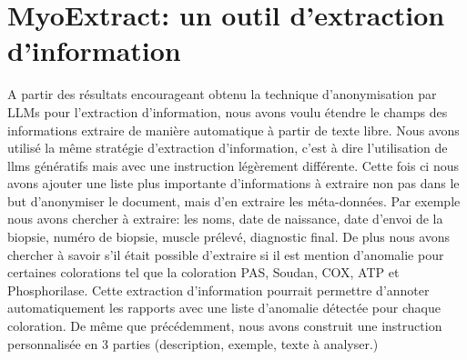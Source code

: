 \section{MyoExtract: un outil d'extraction d'information}
A partir des résultats encourageant obtenu la technique d'anonymisation par LLMs pour l'extraction d'information, nous avons voulu étendre le champs des informations extraire de manière automatique à partir de texte libre. Nous avons utilisé la même stratégie d'extraction d'information, c'est à dire l'utilisation de \gls{llms} génératifs mais avec une instruction légèrement différente. Cette fois ci nous avons ajouter une liste plus importante d'informations à extraire non pas dans le but d'anonymiser le document, mais d'en extraire les méta-données. Par exemple nous avons chercher à extraire: les noms, date de naissance, date d'envoi de la biopsie, numéro de biopsie, muscle prélevé, diagnostic final. De plus nous avons chercher à savoir s'il était possible d'extraire si il est mention d'anomalie pour certaines colorations tel que la coloration PAS, Soudan, COX, ATP et Phosphorilase. Cette extraction d'information pourrait permettre d'annoter automatiquement les rapports avec une liste d'anomalie détectée pour chaque coloration. De même que précédemment, nous avons construit une instruction personnalisée en 3 parties (description, exemple, texte à analyser.)

